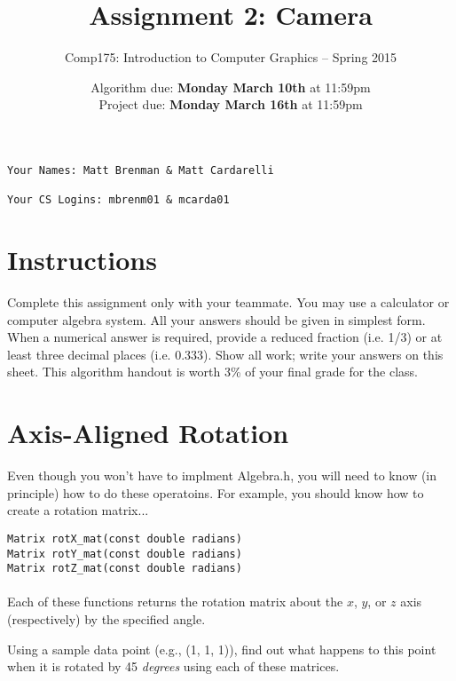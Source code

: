 \documentclass[10pt,twocolumn]{article}
\title{\Huge{\bf Assignment 2: Camera}}
\author{Comp175: Introduction to Computer Graphics -- Spring 2015}
\date{Algorithm due:  {\bf Monday March 10th} at 11:59pm\\
Project due:  {\bf Monday March 16th} at 11:59pm}
\begin{document}
\maketitle

\begin{verbatim}
Your Names: Matt Brenman & Matt Cardarelli

Your CS Logins: mbrenm01 & mcarda01
\end{verbatim}

\section{Instructions}
Complete this assignment only with your teammate. You may use a
calculator or computer algebra system. All your answers should be given in simplest form.
When a numerical answer is required, provide a reduced fraction (i.e. 1/3) or at least three
decimal places (i.e. 0.333). Show all work; write your answers on this sheet. This algorithm handout is worth 3\% of your final grade for the class.

\vspace{-0.4cm}
\section{Axis-Aligned Rotation}

Even though you won't have to implment Algebra.h, you will need to know (in principle) how to do these operatoins. For example, you should know how to create a rotation matrix...

{\tt Matrix rotX\_mat(const double radians)}\\
{\tt Matrix rotY\_mat(const double radians)}\\
{\tt Matrix rotZ\_mat(const double radians)}\\\\
Each of these functions returns the rotation matrix about the $x$, $y$, or $z$ axis (respectively) by the specified angle.
\begin{framed}
\noindent {\bf [1 point]} Using a sample data point (e.g., (1, 1, 1)), find out what happens to this point when it is rotated by 45 \emph{degrees} using each of these matrices.
\end{framed}
\end{document}
